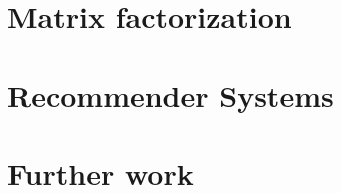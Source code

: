 \documentclass[12pt]{article}
\begin{document}
\section{Matrix factorization}

\section{Recommender Systems}

\section{Further work}
\end{document}
